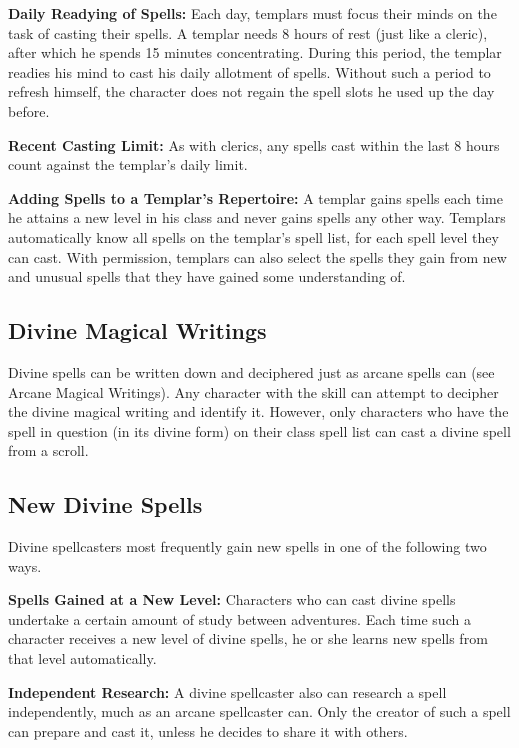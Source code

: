 \textbf{Daily Readying of Spells:} Each day, templars must focus their minds on the task of casting their spells. A templar needs 8 hours of rest (just like a cleric), after which he spends 15 minutes concentrating. During this period, the templar readies his mind to cast his daily allotment of spells. Without such a period to refresh himself, the character does not regain the spell slots he used up the day before.

\textbf{Recent Casting Limit:} As with clerics, any spells cast within the last 8 hours count against the templar's daily limit.

\textbf{Adding Spells to a Templar's Repertoire:} A templar gains spells each time he attains a new level in his class and never gains spells any other way. Templars automatically know all spells on the templar's spell list, for each spell level they can cast. With permission, templars can also select the spells they gain from new and unusual spells that they have gained some understanding of.

\subsection{Divine Magical Writings}
Divine spells can be written down and deciphered just as arcane spells can (see Arcane Magical Writings). Any character with the  skill can attempt to decipher the divine magical writing and identify it. However, only characters who have the spell in question (in its divine form) on their class spell list can cast a divine spell from a scroll.

\subsection{New Divine Spells}
Divine spellcasters most frequently gain new spells in one of the following two ways.

\textbf{Spells Gained at a New Level:} Characters who can cast divine spells undertake a certain amount of study between adventures. Each time such a character receives a new level of divine spells, he or she learns new spells from that level automatically.

\textbf{Independent Research:} A divine spellcaster also can research a spell independently, much as an arcane spellcaster can. Only the creator of such a spell can prepare and cast it, unless he decides to share it with others.
